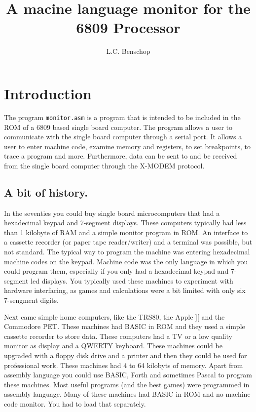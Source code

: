 \title{A macine language monitor for the 6809 Processor}
\author{L.C. Benschop}

\maketitle
\tableofcontents
\chapter{Introduction}

The program {\tt monitor.asm} is a program that is intended to be included
in the ROM of a 6809 based single board computer. The program allows a user
to communicate with the single board computer through a serial port. It
allows a user to enter machine code, examine memory and registers, to set
breakpoints, to trace a program and more. Furthermore, data can be sent to
and be received from the single board computer through the X-MODEM protocol.

\section{A bit of history.}

In the seventies you could buy single board microcomputers that had a
hexadecimal keypad and 7-segment displays. These computers typically had
less than 1 kilobyte of RAM and a simple monitor program in ROM. An
interface to a cassette recorder (or paper tape reader/writer) and a
terminal was possible, but not standard. The typical way to program the
machine was entering hexadecimal machine codes on the keypad. Machine code
was the only language in which you could program them, especially if you
only had a hexadecimal keypad and 7-segment led displays. You typically used
these machines to experiment with hardware interfacing, as games and
calculations were a bit limited with only six 7-sengment digits.

Next came simple home computers, like the TRS80, the Apple ][ and the
Commodore PET. These machines had BASIC in ROM and they used a simple
cassette recorder to store data. These computers had a TV or a low quality
monitor as display and a QWERTY keyboard. These machines could be upgraded
with a floppy disk drive and a printer and then they could be used for
professional work. These machines had 4 to 64 kilobyts of memory.
Apart from assembly language you could use BASIC, Forth
and sometimes Pascal to program these machines. Most useful programs (and
the best games) were programmed in assembly language. Many of these machines
had BASIC in ROM and no machine code monitor. You had to load that
separately.

